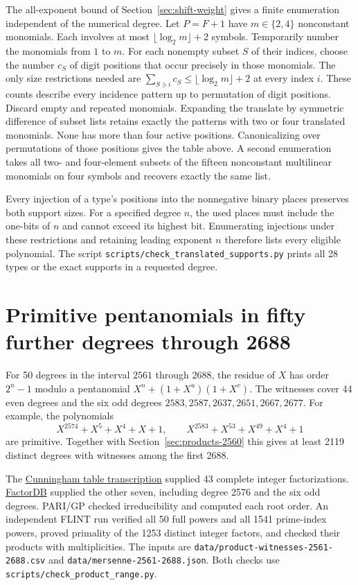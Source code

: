 \documentclass[11pt]{article}
\begin{document}
The all-exponent bound of Section~\ref{sec:shift-weight} gives a
finite enumeration independent of the numerical degree. Let \(P=F+1\)
have \(m\in\{2,4\}\) nonconstant monomials. Each involves at most
\(\lfloor\log_2 m\rfloor+2\) symbols. Temporarily number the monomials
from \(1\) to \(m\). For each nonempty subset \(S\) of their indices,
choose the number \(c_S\) of digit positions that occur precisely in
those monomials. The only size restrictions needed are
\(\sum_{S\ni i}c_S\le\lfloor\log_2 m\rfloor+2\) at every index \(i\).
These counts describe every incidence pattern up to permutation of
digit positions. Discard empty and repeated monomials. Expanding the
translate by symmetric difference of subset lists retains exactly the
patterns with two or four translated monomials. None has more than
four active positions. Canonicalizing over permutations of those
positions gives the table above. A second enumeration takes all
two- and four-element subsets of the fifteen nonconstant multilinear
monomials on four symbols and recovers exactly the same list.

Every injection of a type's positions into the nonnegative binary
places preserves both support sizes. For a specified degree \(n\),
the used places must include the one-bits of \(n\) and cannot exceed
its highest bit. Enumerating injections under these restrictions and
retaining leading exponent \(n\) therefore lists every eligible
polynomial. The script \nolinkurl{scripts/check_translated_supports.py}
prints all 28 types or the exact supports in a requested degree.

\section{Primitive pentanomials in fifty further degrees through 2688}
\label{sec:products-2688}
For 50 degrees in the interval \(2561\) through \(2688\), the
residue of \(X\) has order \(2^n-1\) modulo a pentanomial
\(X^n+(1+X^u)(1+X^v)\). The witnesses cover 44 even degrees
and the six odd degrees \(2583,2587,2637,2651,2667,2677\).
For example, the polynomials
\[
 X^{2574}+X^5+X^4+X+1,\qquad
 X^{2583}+X^{53}+X^{49}+X^4+1
\]
are primitive. Together with Section~\ref{sec:products-2560} this
gives at least 2119 distinct degrees with witnesses among the first 2688.

The \href{https://github.com/postvakje/Reformatted-Cunningham-Project-tables/blob/dff2e282ff15399b16b4fb840a410aa2a37076b7/pmain422_table2-.json}{Cunningham table transcription}
supplied 43 complete integer factorizations.
\href{https://factordb.com/index.php?query=2\%5E2583-1}{FactorDB}
supplied the other seven, including degree 2576 and the six odd degrees.
PARI/GP checked irreducibility and computed each root order. An
independent FLINT run verified all 50 full powers and all 1541
prime-index powers, proved primality of the 1253 distinct integer
factors, and checked their products with multiplicities. The inputs are
\nolinkurl{data/product-witnesses-2561-2688.csv} and
\nolinkurl{data/mersenne-2561-2688.json}. Both checks use
\nolinkurl{scripts/check_product_range.py}.
\end{document}
